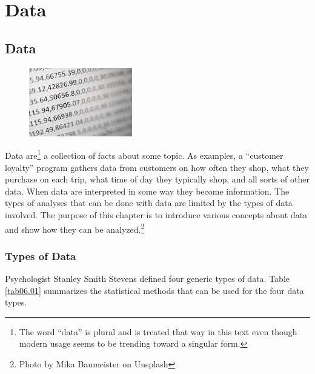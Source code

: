 \chapter{Data}\label{06:data}


\section{Data}\label{intro:TypesOfData}

\begin{figure}
	\label{05:fig01} 
	\centering
	\includegraphics[width=0.4\textwidth]{gfx/06-data} 
\end{figure}
Data are\footnote{The word ``data'' is plural and is treated that way in this text even though modern usage seems to be trending toward a singular form.} a collection of facts about some topic. As examples, a ``customer loyalty'' program gathers data from customers on how often they shop, what they purchase on each trip, what time of day they typically shop, and all sorts of other data. When data are interpreted in some way they become information. The types of analyses that can be done with data are limited by the types of data involved. The purpose of this chapter is to introduce various concepts about data and show how they can be analyzed.\footnote{Photo by Mika Baumeister on Unsplash}

\subsection{Types of Data}

Psychologist Stanley Smith Stevens defined four generic types of data\cite{stevens1946theory}. Table \ref{tab06.01} summarizes the statistical methods that can be used for the four data types.

